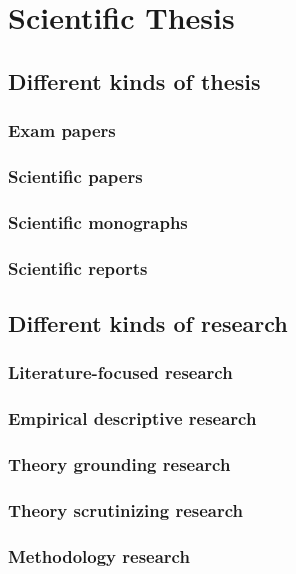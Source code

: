 \chapter{Scientific Thesis}

\lipsum[1]

\section{Different kinds of thesis}

\lipsum[2]

\subsection{Exam papers}

\lipsum[3]

\subsection{Scientific papers}

\lipsum[4]

\subsection{Scientific monographs}

\lipsum[5]

\subsection{Scientific reports}

\lipsum[6]

\section{Different kinds of research}

\lipsum[7]

\subsection{Literature-focused research}

\lipsum[8]

\subsection{Empirical descriptive research}

\lipsum[9]

\subsection{Theory grounding research}

\lipsum[10]

\subsection{Theory scrutinizing research}

\lipsum[11]

\subsection{Methodology research}

\lipsum[12]
